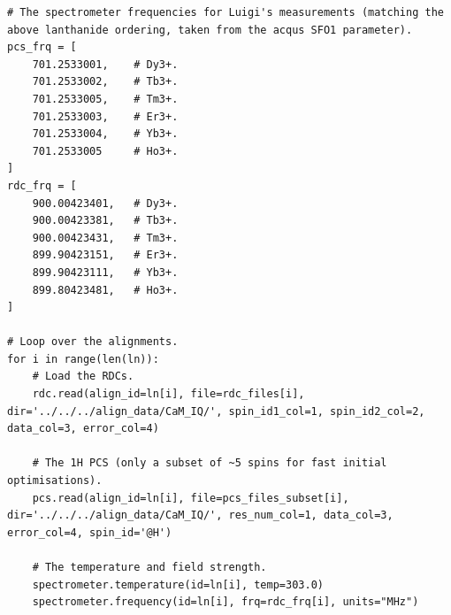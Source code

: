 \begin{lstlisting}
# The spectrometer frequencies for Luigi's measurements (matching the above lanthanide ordering, taken from the acqus SFO1 parameter).
pcs_frq = [
    701.2533001,    # Dy3+.
    701.2533002,    # Tb3+.
    701.2533005,    # Tm3+.
    701.2533003,    # Er3+.
    701.2533004,    # Yb3+.
    701.2533005     # Ho3+.
]
rdc_frq = [
    900.00423401,   # Dy3+.
    900.00423381,   # Tb3+.
    900.00423431,   # Tm3+.
    899.90423151,   # Er3+.
    899.90423111,   # Yb3+.
    899.80423481,   # Ho3+.
]

# Loop over the alignments.
for i in range(len(ln)):
    # Load the RDCs.
    rdc.read(align_id=ln[i], file=rdc_files[i], dir='../../../align_data/CaM_IQ/', spin_id1_col=1, spin_id2_col=2, data_col=3, error_col=4)

    # The 1H PCS (only a subset of ~5 spins for fast initial optimisations).
    pcs.read(align_id=ln[i], file=pcs_files_subset[i], dir='../../../align_data/CaM_IQ/', res_num_col=1, data_col=3, error_col=4, spin_id='@H')

    # The temperature and field strength.
    spectrometer.temperature(id=ln[i], temp=303.0)
    spectrometer.frequency(id=ln[i], frq=rdc_frq[i], units="MHz")


\end{lstlisting}
